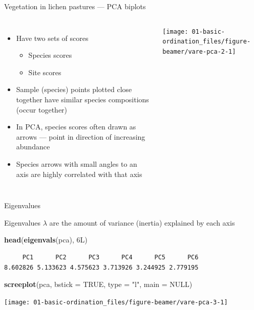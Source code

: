 \documentclass[10pt,ignorenonframetext,compress, aspectratio=169]{beamer}
\newenvironment{Shaded}{\begin{snugshade}}{\end{snugshade}}
\newcommand{\KeywordTok}[1]{\textcolor[rgb]{0.13,0.29,0.53}{\textbf{{#1}}}}
\newcommand{\DataTypeTok}[1]{\textcolor[rgb]{0.13,0.29,0.53}{{#1}}}
\newcommand{\StringTok}[1]{\textcolor[rgb]{0.31,0.60,0.02}{{#1}}}
\newcommand{\OtherTok}[1]{\textcolor[rgb]{0.56,0.35,0.01}{{#1}}}
\newcommand{\NormalTok}[1]{{#1}}
\providecommand{\tightlist}{%
  \setlength{\itemsep}{0pt}\setlength{\parskip}{0pt}}
\newcommand{\columnsbegin}{\begin{columns}}
\newcommand{\columnsend}{\end{columns}}
\begin{document}
\begin{frame}{Vegetation in lichen pastures --- PCA biplots}

\columnsbegin
{}

\begin{itemize}
\tightlist
\item
  Have two sets of scores

  \begin{itemize}
  \tightlist
  \item
    Species scores
  \item
    Site scores
  \end{itemize}
\item
  Sample (species) points plotted close together have similar species
  compositions (occur together)
\item
  In PCA, species scores often drawn as arrows --- point in direction of
  increasing abundance
\item
  Species arrows with small angles to an axis are highly correlated with
  that axis
\end{itemize}


\begin{center}\texttt{[image: 01-basic-ordination\_files/figure-beamer/vare-pca-2-1]} \end{center}

\columnsend

\end{frame}

\begin{frame}[fragile]{Eigenvalues}

Eigenvalues \(\lambda\) are the amount of variance (inertia) explained
by each axis

\begin{Shaded}
\begin{Highlighting}[]
\KeywordTok{head}\NormalTok{(}\KeywordTok{eigenvals}\NormalTok{(pca), 6L)}
\end{Highlighting}
\end{Shaded}

\begin{verbatim}
     PC1      PC2      PC3      PC4      PC5      PC6 
8.602826 5.133623 4.575623 3.713926 3.244925 2.779195 
\end{verbatim}

\begin{Shaded}
\begin{Highlighting}[]
\KeywordTok{screeplot}\NormalTok{(pca, }\DataTypeTok{bstick =} \OtherTok{TRUE}\NormalTok{, }\DataTypeTok{type =} \StringTok{"l"}\NormalTok{, }\DataTypeTok{main =} \OtherTok{NULL}\NormalTok{)}
\end{Highlighting}
\end{Shaded}

\begin{center}\texttt{[image: 01-basic-ordination\_files/figure-beamer/vare-pca-3-1]} \end{center}

\end{frame}
\end{document}
